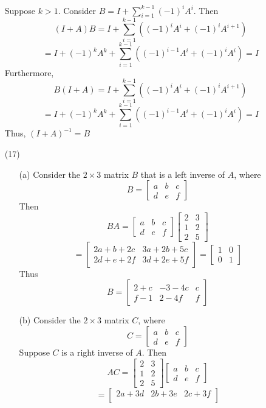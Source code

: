\documentclass[12pt]{article}
\begin{document}
\begin{itemize}
Suppose $k > 1$. Consider $B = I + \sum_{i=1}^{k-1}(-1)^iA^i$. Then
$$(I+A)B = I + \sum_{i=1}^{k-1}\left((-1)^iA^i + (-1)^iA^{i+1}\right)$$
$$= I + (-1)^kA^k + \sum_{i=1}^{k-1}
\left( (-1)^{i-1}A^i + (-1)^iA^i \right) = I$$
Furthermore,
$$B(I+A) = I + \sum_{i=1}^{k-1}\left((-1)^iA^i + (-1)^iA^{i+1}\right)$$
$$= I + (-1)^kA^k + \sum_{i=1}^{k-1}
\left( (-1)^{i-1}A^i + (-1)^iA^i \right) = I$$
Thus, $(I + A)^{-1} = B$
\item[(17)]
\begin{itemize}
\item[(a)]
Consider the $2 \times 3$ matrix $B$ that is a left inverse of $A$, where
$$B = \begin{bmatrix}
a & b & c \\
d & e & f
\end{bmatrix}$$
Then
$$BA = \begin{bmatrix}
a & b & c \\
d & e & f
\end{bmatrix}\begin{bmatrix}
2 & 3 \\
1 & 2 \\
2 & 5
\end{bmatrix}$$
$$= \begin{bmatrix}
2a + b + 2c & 3a + 2b + 5c \\
2d + e + 2f & 3d + 2e + 5f
\end{bmatrix} = \begin{bmatrix}
1 & 0 \\
0 & 1
\end{bmatrix}$$
Thus
$$B = \begin{bmatrix}
2 + c & -3 - 4c & c \\
f - 1 & 2 - 4f & f
\end{bmatrix}$$
\item[(b)]
Consider the $2 \times 3$ matrix $C$, where
$$C = \begin{bmatrix}
a & b & c \\
d & e & f
\end{bmatrix}$$
Suppose $C$ is a right inverse of $A$. Then
$$AC = \begin{bmatrix}
2 & 3 \\
1 & 2 \\
2 & 5
\end{bmatrix}\begin{bmatrix}
a & b & c \\
d & e & f
\end{bmatrix}$$
$$ = \begin{bmatrix}
2a + 3d & 2b + 3e & 2c + 3f \\

\end{bmatrix}$$
\end{itemize}
\end{itemize}
\end{document}

